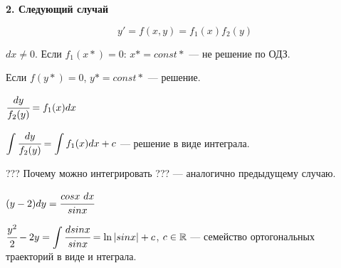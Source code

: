 \begin{center}
\textbf{\large{2. Следующий случай}}
\end{center}

\begin{equation}
    y' = f(x, y) = f_1(x)f_2(y)
\end{equation}

$dx \neq 0$. Если $f_1(x*) = 0$: $x* = const*$ --- не решение по ОДЗ.

Если $f(y*) = 0$, $y* = const*$ --- решение.

$\cfrac{dy}{f_2(y)} = f_1(x) dx$

$ \displaystyle \int\cfrac{dy}{f_2(y)} = \int f_1(x) dx + c$ --- решение в виде интеграла.

??? Почему можно интегрировать ??? --- аналогично предыдущему случаю.

\begin{example}
    $(y - 2)dy = \cfrac{cosx\ dx}{sinx}$
    
    $\displaystyle \cfrac{y^2}{2} - 2y = \int\cfrac{dsinx}{sinx} = \ln|sinx| + c$, $c \in \mathbb{R}$ --- семейство ортогональных траекторий в виде и нтеграла.
\end{example}